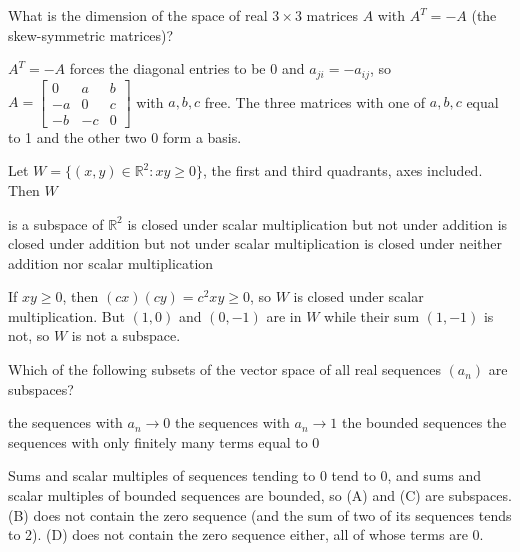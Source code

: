 \begin{question}[id=vs-16]
What is the dimension of the space of real $3 \times 3$ matrices $A$ with $A^T = -A$ (the skew-symmetric matrices)?
\begin{solution}
$A^T = -A$ forces the diagonal entries to be 0 and $a_{ji} = -a_{ij}$, so $A = \begin{bmatrix} 0 & a & b \\ -a & 0 & c \\ -b & -c & 0 \end{bmatrix}$ with $a, b, c$ free. The three matrices with one of $a, b, c$ equal to 1 and the other two 0 form a basis.
\end{solution}
\end{question}

\begin{question}[id=vs-17, marks=2]
Let $W = \{(x, y) \in \mathbb{R}^2 : xy \ge 0\}$, the first and third quadrants, axes included. Then $W$
\begin{options}
  \option is a subspace of $\mathbb{R}^2$
  \correct is closed under scalar multiplication but not under addition
  \option is closed under addition but not under scalar multiplication
  \option is closed under neither addition nor scalar multiplication
\end{options}
\begin{solution}
If $xy \ge 0$, then $(cx)(cy) = c^2 xy \ge 0$, so $W$ is closed under scalar multiplication. But $(1, 0)$ and $(0, -1)$ are in $W$ while their sum $(1, -1)$ is not, so $W$ is not a subspace.
\end{solution}
\end{question}

\begin{question}[id=vs-18, type=msq, marks=2]
Which of the following subsets of the vector space of all real sequences $(a_n)$ are subspaces?
\begin{options}
  \correct the sequences with $a_n \to 0$
  \option the sequences with $a_n \to 1$
  \correct the bounded sequences
  \option the sequences with only finitely many terms equal to 0
\end{options}
\begin{solution}
Sums and scalar multiples of sequences tending to 0 tend to 0, and sums and scalar multiples of bounded sequences are bounded, so (A) and (C) are subspaces. (B) does not contain the zero sequence (and the sum of two of its sequences tends to 2). (D) does not contain the zero sequence either, all of whose terms are 0.
\end{solution}
\end{question}

